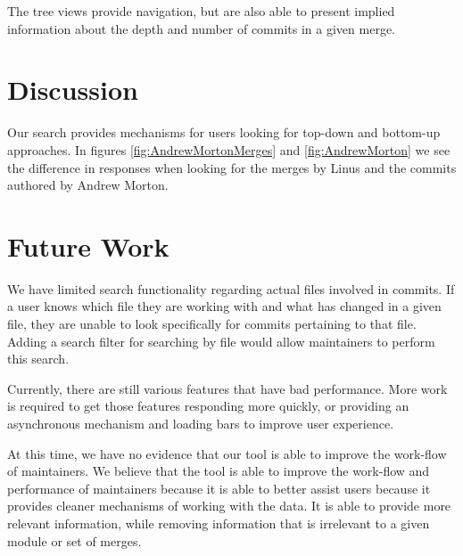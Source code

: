 \documentclass[conference, draftclsnofoot]{IEEEtran}
\begin{document}

The tree views provide navigation, but are also able to present implied
information about the depth and number of commits in a given merge.

\section{Discussion}

Our search provides mechanisms for users looking for top-down and bottom-up
approaches. In figures \ref{fig:AndrewMortonMerges} and \ref{fig:AndrewMorton}
we see the difference in responses when looking for the merges by Linus and the
commits authored by Andrew Morton.


%



\section{Future Work}
We have limited search functionality regarding actual files involved in
commits. If a user knows which file they are working with and what has changed
in a given file, they are unable to look specifically for commits pertaining to
that file. Adding a search filter for searching by file would allow maintainers
to perform this search.

Currently, there are still various features that have bad performance. More
work is required to get those features responding more quickly, or providing an
asynchronous mechanism and loading bars to improve user experience.

At this time, we have no evidence that our tool is able to improve the
work-flow of maintainers. We believe that the tool is able to improve the
work-flow and performance of maintainers because it is able to better assist
users because it provides cleaner mechanisms of working with the data. It is
able to provide more relevant information, while removing information that is
irrelevant to a given module or set of merges.
\end{document}
